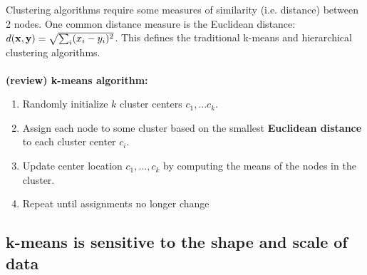 \documentclass[./some_latex_template.tex]{subfiles}
\begin{document}
Clustering algorithms require some measures of similarity (i.e. distance) between 2 nodes. One common distance measure is the Euclidean distance: $d(\mathbf{x}, \mathbf{y}) = \sqrt{\sum_{i}(x_i - y_i)^2}$. This defines the traditional k-means and hierarchical clustering algorithms.\\
\\
\textbf{(review) k-means algorithm:}
\begin{enumerate}
	\item Randomly initialize $k$ cluster centers $c_1,...c_k$. 
	\item Assign each node to some cluster based on the smallest \textbf{Euclidean distance} to each cluster center $c_i$.
	\item Update center location $c_1, ..., c_k$ by computing the means of the nodes in the cluster. 
	\item Repeat until assignments no longer change
\end{enumerate}

\subsection{k-means is sensitive to the shape and scale of data}
\end{document}
